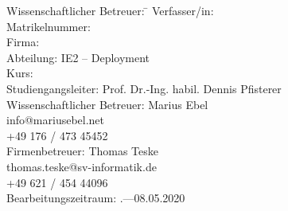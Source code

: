 \begin{titlepage}
\begin{center}
\begin{minipage}{\textwidth}
\begin{tabbing}
	Wissenschaftlicher Betreuer: \hspace{0.85cm}\=\kill
	Verfasser/in: \> \DerAutorDerArbeit \\[1.5mm]
	Matrikelnummer:  \\[1.5mm]
	Firma: \> \DerNameDerFirma  \\[1.5mm]
	Abteilung: \> IE2 -- Deployment \\[1.5mm]
	Kurs: \> \DieKursbezeichnung \\[1.5mm]
	Studiengangsleiter: \> Prof. Dr.-Ing. habil. Dennis Pfisterer \\[1.5mm]
	Wissenschaftlicher Betreuer: \> Marius Ebel \\
	\> info@mariusebel.net \\
	\> +49 176 / 473 45452 \\[1.5mm]
	Firmenbetreuer: \> Thomas Teske \\
	\> thomas.teske@sv-informatik.de \\
	\> +49 621 / 454 44096 \\[1.5mm]
	Bearbeitungszeitraum: .---08.05.2020
\end{tabbing}
\end{minipage}

\end{center}

\end{titlepage}